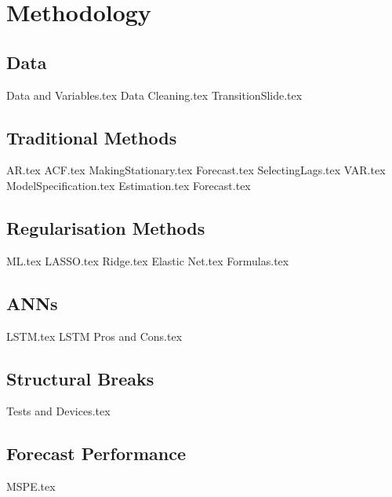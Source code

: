 \section{Methodology}

\subsection{Data}
{Data and Variables.tex}
{Data Cleaning.tex}
{TransitionSlide.tex}


\subsection{Traditional Methods}
{AR.tex}
{ACF.tex}
{MakingStationary.tex}
{Forecast.tex}
{SelectingLags.tex}
{VAR.tex}
{ModelSpecification.tex}
{Estimation.tex}
{Forecast.tex}

\subsection{Regularisation Methods}
{ML.tex}
{LASSO.tex}
{Ridge.tex}
{Elastic Net.tex}
{Formulas.tex}

\subsection{ANNs}
{LSTM.tex}
{LSTM Pros and Cons.tex}

\subsection{Structural Breaks}
{Tests and Devices.tex}

\subsection{Forecast Performance}
{MSPE.tex}
